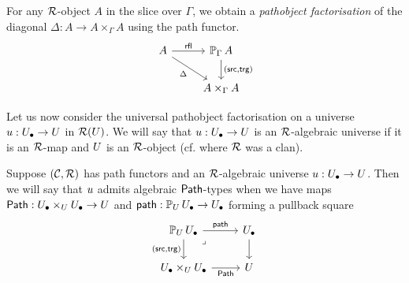 For any $\RR$-object $A$ in the slice over $\Gamma$,
we obtain a \emph{pathobject factorisation} of the diagonal
$\Delta : A \to A \times_\Gamma A$ using the path functor.
\[\begin{tikzcd}
	{A} & {\arr[\Gamma]{A}} \\
	& {{A} \times_\Gamma A}
	\arrow["\rfl", from=1-1, to=1-2]
	\arrow["{\Delta}"', from=1-1, to=2-2]
	\arrow["{(\src,\trg)}", from=1-2, to=2-2]
\end{tikzcd}\]



Let us now consider the universal pathobject factorisation
on a universe $\uu : \Ulow \to \U$ in $\RR(\U)$.
We will say that $\uu : \Ulow \to \U$ is an $\RR$-algebraic
universe if it is an $\RR$-map and $\U$ is an $\RR$-object
(cf.  where $\RR$ was a clan).

\begin{definition}\label{def:mltt-alg-path-types-2}
  Suppose $(\CC,\RR)$ has path functors
  and an $\RR$-algebraic universe
  $\uu : \Ulow \to \U$.
  Then we will say that $\uu$ admits algebraic $\Path$-types
  when we have maps
  $\Path : \Ulow \times_\U \Ulow \to \U$
  and $\path : \arr[\U] \Ulow \to \Ulow$
  forming a pullback square
  \[
  \begin{tikzcd}
    {{\arr[\U] \Ulow}} & \Ulow \\
    {\Ulow \times_\U \Ulow} & \U
    \arrow["\path", from=1-1, to=1-2]
    \arrow["{(\src,\trg)}"', from=1-1, to=2-1]
    \arrow[from=1-2, to=2-2]
    \arrow["\Path"', from=2-1, to=2-2]
    \arrow["\lrcorner"{anchor=center, pos=0.125}, draw=none, from=1-1, to=2-2]
  \end{tikzcd}\]
\end{definition}

